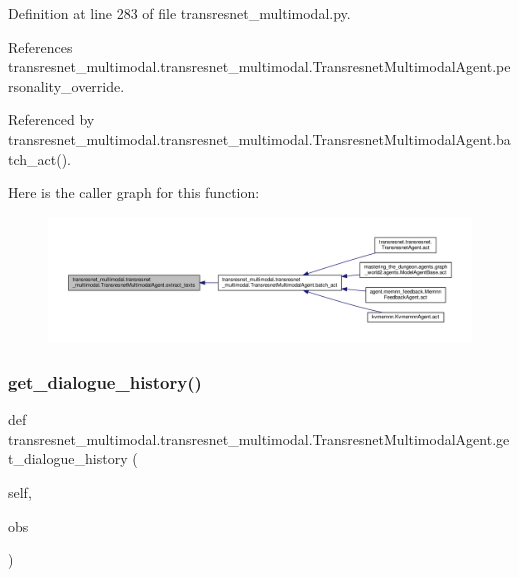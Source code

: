Definition at line 283 of file transresnet\+\_\+multimodal.\+py.



References transresnet\+\_\+multimodal.\+transresnet\+\_\+multimodal.\+Transresnet\+Multimodal\+Agent.\+personality\+\_\+override.



Referenced by transresnet\+\_\+multimodal.\+transresnet\+\_\+multimodal.\+Transresnet\+Multimodal\+Agent.\+batch\+\_\+act().

Here is the caller graph for this function\+:
\nopagebreak
\begin{figure}[H]
\begin{center}
\leavevmode
\includegraphics[width=350pt]{classtransresnet__multimodal_1_1transresnet__multimodal_1_1TransresnetMultimodalAgent_ac1e4bd7463865562a56b8d204127f26e_icgraph}
\end{center}
\end{figure}
\mbox{\label{classtransresnet__multimodal_1_1transresnet__multimodal_1_1TransresnetMultimodalAgent_a84b3d72c768687151e9a6b5461927034}} 
\subsubsection{\texorpdfstring{get\+\_\+dialogue\+\_\+history()}{get\_dialogue\_history()}}
{\footnotesize\ttfamily def transresnet\+\_\+multimodal.\+transresnet\+\_\+multimodal.\+Transresnet\+Multimodal\+Agent.\+get\+\_\+dialogue\+\_\+history (\begin{DoxyParamCaption}\item[{}]{self,  }\item[{}]{obs }\end{DoxyParamCaption})}

